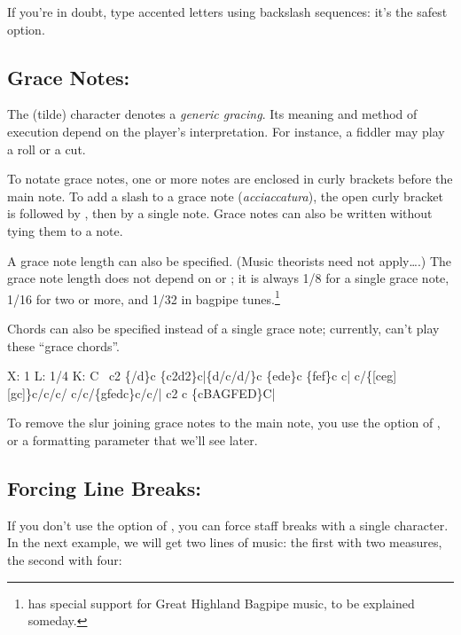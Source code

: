 \documentclass[a4paper,12pt]{book}
\begin{document}
If you're in doubt, type accented letters using backslash sequences:
it's the safest option.


\subsection{Grace Notes: \icmd{\textasciitilde{} \{\}}}

The \car{\textasciitilde{}} (tilde) character denotes a \emph{generic
gracing}. Its meaning and method of execution depend on the player's
interpretation. For instance, a fiddler may play a roll or a cut.

To notate grace notes, one or more notes are enclosed in curly brackets
before the main note. To add a slash to a grace note
(\emph{acciaccatura}), the open curly bracket is followed by \car{/},
then by a single note. Grace notes can also be written without tying
them to a note.


A grace note length can also be specified. (Music theorists need not
apply{\ldots}.) The grace note length does not depend on  or
; it is always 1/8 for a single grace note, 1/16 for two or
more, and 1/32 in bagpipe tunes.\footnote{\abcm{} has special support
for Great Highland Bagpipe music, to be explained someday.}

Chords can also be specified instead of a single grace note;
currently, \abcmid{} can't play these ``grace chords''.


\begin{abcsource}
X: 1
L: 1/4
K: C
~c2 \{/d\}c \{c2d2\}c|\{d/c/d/\}c \{ede\}c \{fef\}c c|
c/\{[ceg][gc]\}c/c/c/ c/c/\{gfedc\}c/c/| c2 c \{cBAGFED\}C|
\end{abcsource}


To remove the slur joining grace notes to the main note, you use the
 option of \abcm, or a formatting parameter that we'll see
later.


\subsection{Forcing Line Breaks: \icmd{!}}

If you don't use the  option of \abcm, you can force staff
breaks with a single \car{!} character. In the next example, we will
get two lines of music: the first with two measures, the second with
four:
\end{document}
